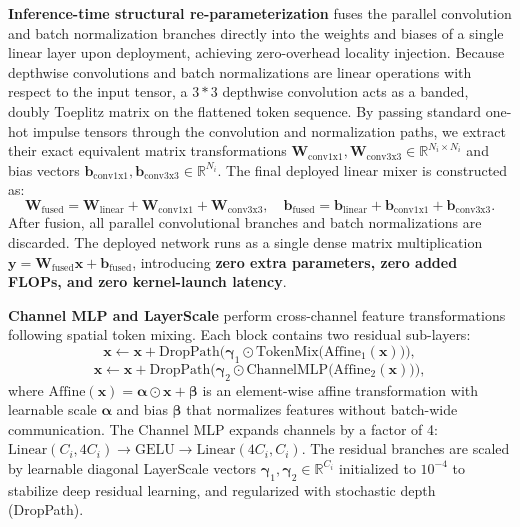 \textbf{Inference-time structural re-parameterization} fuses the parallel convolution and batch normalization branches directly into the weights and biases of a single linear layer upon deployment, achieving zero-overhead locality injection. Because depthwise convolutions and batch normalizations are linear operations with respect to the input tensor, a $3*3$ depthwise convolution acts as a banded, doubly Toeplitz matrix on the flattened token sequence. By passing standard one-hot impulse tensors through the convolution and normalization paths, we extract their exact equivalent matrix transformations $\mathbf{W}_{\text{conv1x1}}, \mathbf{W}_{\text{conv3x3}} \in \mathbb{R}^{N_i \times N_i}$ and bias vectors $\mathbf{b}_{\text{conv1x1}}, \mathbf{b}_{\text{conv3x3}} \in \mathbb{R}^{N_i}$. The final deployed linear mixer is constructed as:
\begin{equation}
\mathbf{W}_{\text{fused}} = \mathbf{W}_{\text{linear}} + \mathbf{W}_{\text{conv1x1}} + \mathbf{W}_{\text{conv3x3}}, \quad \mathbf{b}_{\text{fused}} = \mathbf{b}_{\text{linear}} + \mathbf{b}_{\text{conv1x1}} + \mathbf{b}_{\text{conv3x3}}.
\end{equation}
After fusion, all parallel convolutional branches and batch normalizations are discarded. The deployed network runs as a single dense matrix multiplication $\mathbf{y} = \mathbf{W}_{\text{fused}} \mathbf{x} + \mathbf{b}_{\text{fused}}$, introducing \textbf{zero extra parameters, zero added FLOPs, and zero kernel-launch latency}.

\textbf{Channel MLP and LayerScale} perform cross-channel feature transformations following spatial token mixing. Each block contains two residual sub-layers:
\begin{equation}
\mathbf{x} \leftarrow \mathbf{x} + \text{DropPath}\Big(\boldsymbol{\gamma}_1 \odot \text{TokenMix}\big(\text{Affine}_1(\mathbf{x})\big)\Big),
\end{equation}
\begin{equation}
\mathbf{x} \leftarrow \mathbf{x} + \text{DropPath}\Big(\boldsymbol{\gamma}_2 \odot \text{ChannelMLP}\big(\text{Affine}_2(\mathbf{x})\big)\Big),
\end{equation}
where $\text{Affine}(\mathbf{x}) = \boldsymbol{\alpha} \odot \mathbf{x} + \boldsymbol{\beta}$ is an element-wise affine transformation with learnable scale $\boldsymbol{\alpha}$ and bias $\boldsymbol{\beta}$ that normalizes features without batch-wide communication. The Channel MLP expands channels by a factor of 4: $\text{Linear}(C_i, 4C_i) \rightarrow \text{GELU} \rightarrow \text{Linear}(4C_i, C_i)$. The residual branches are scaled by learnable diagonal LayerScale vectors $\boldsymbol{\gamma}_1, \boldsymbol{\gamma}_2 \in \mathbb{R}^{C_i}$ initialized to $10^{-4}$ to stabilize deep residual learning, and regularized with stochastic depth (DropPath).

